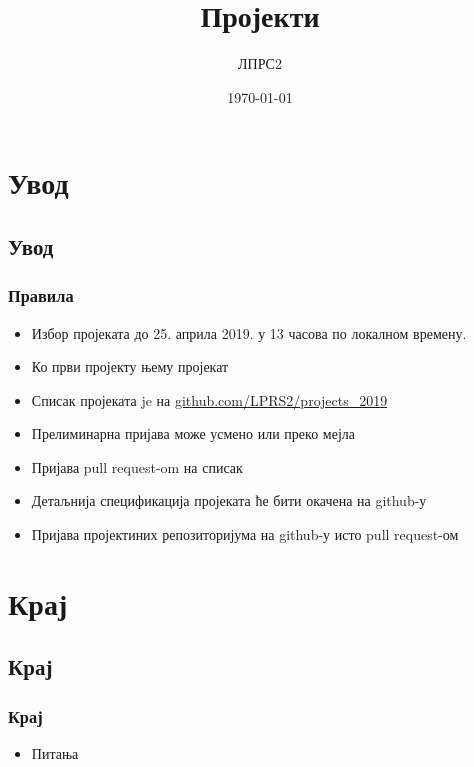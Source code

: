 \documentclass[compress]{beamer}
\title{Пројекти}
\author{ЛПРС2}
\institute{РТ-РК}
\date{\today}
\begin{document}


\frame{\titlepage}

\section{Увод}
\subsection{Увод}
\begin{frame}
	\frametitle{\textbf{Правила}}
	
	\begin{itemize}
		\item Избор пројеката до 25. априла 2019.
			у 13 часова по локалном времену.
		\item Ко први пројекту њему пројекат
		\item Списак пројеката je на \url{github.com/LPRS2/projects_2019}
		\item Прелиминарна пријава може усмено или преко мејла
		\item Пријава pull request-om на списак
		\item Детаљнија спецификација пројеката ће бити окачена на github-у
		\item Пријава пројектиних репозиторијума на github-у
			исто pull request-ом
	\end{itemize}
\end{frame}



\section{Крај}
\subsection{Крај}
\begin{frame}
	\frametitle{\textbf{Крај}}
	\begin{itemize}
		\item Питања
	\end{itemize}
\end{frame}

\end{document}
